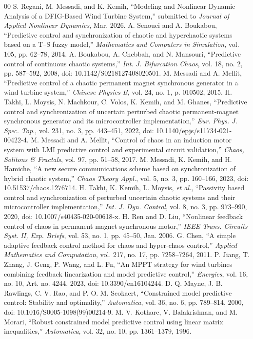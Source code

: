 \documentclass[conference]{IEEEtran}
\begin{document}
\begin{thebibliography}{00}
 S. Regani, M. Messadi, and K. Kemih, ``Modeling and Nonlinear Dynamic Analysis of a DFIG-Based Wind Turbine System,'' submitted to \textit{Journal of Applied Nonlinear Dynamics}, Mar. 2026.
 A. Senouci and A. Boukabou, ``Predictive control and synchronization of chaotic and hyperchaotic systems based on a T--S fuzzy model,'' \textit{Mathematics and Computers in Simulation}, vol. 105, pp. 62--78, 2014.
 A. Boukabou, A. Chebbah, and N. Mansouri, ``Predictive control of continuous chaotic systems,'' \textit{Int. J. Bifurcation Chaos}, vol. 18, no. 2, pp. 587--592, 2008, doi: 10.1142/S0218127408020501.
 M. Messadi and A. Mellit, ``Predictive control of a chaotic permanent magnet synchronous generator in a wind turbine system,'' \textit{Chinese Physics B}, vol. 24, no. 1, p. 010502, 2015.
 H. Takhi, L. Moysis, N. Machkour, C. Volos, K. Kemih, and M. Ghanes, ``Predictive control and synchronization of uncertain perturbed chaotic permanent-magnet synchronous generator and its microcontroller implementation,'' \textit{Eur. Phys. J. Spec. Top.}, vol. 231, no. 3, pp. 443--451, 2022, doi: 10.1140/epjs/s11734-021-00422-4.
 M. Messadi and A. Mellit, ``Control of chaos in an induction motor system with LMI predictive control and experimental circuit validation,'' \textit{Chaos, Solitons \& Fractals}, vol. 97, pp. 51--58, 2017.
 M. Messadi, K. Kemih, and H. Hamiche, ``A new secure communications scheme based on synchronization of hybrid chaotic system,'' \textit{Chaos Theory Appl.}, vol. 5, no. 3, pp. 160--166, 2023, doi: 10.51537/chaos.1276714.
 H. Takhi, K. Kemih, L. Moysis, \textit{et al.}, ``Passivity based control and synchronization of perturbed uncertain chaotic systems and their microcontroller implementation,'' \textit{Int. J. Dyn. Control}, vol. 8, no. 3, pp. 973--990, 2020, doi: 10.1007/s40435-020-00618-x.
 H. Ren and D. Liu, ``Nonlinear feedback control of chaos in permanent magnet synchronous motor,'' \textit{IEEE Trans. Circuits Syst. II, Exp. Briefs}, vol. 53, no. 1, pp. 45--50, Jan. 2006.
 G. Chen, ``A simple adaptive feedback control method for chaos and hyper-chaos control,'' \textit{Applied Mathematics and Computation}, vol. 217, no. 17, pp. 7258--7264, 2011.
 P. Jiang, T. Zhang, J. Geng, P. Wang, and L. Fu, ``An MPPT strategy for wind turbines combining feedback linearization and model predictive control,'' \textit{Energies}, vol. 16, no. 10, Art. no. 4244, 2023, doi: 10.3390/en16104244.
 D. Q. Mayne, J. B. Rawlings, C. V. Rao, and P. O. M. Scokaert, ``Constrained model predictive control: Stability and optimality,'' \textit{Automatica}, vol. 36, no. 6, pp. 789--814, 2000, doi: 10.1016/S0005-1098(99)00214-9.
 M. V. Kothare, V. Balakrishnan, and M. Morari, ``Robust constrained model predictive control using linear matrix inequalities,'' \textit{Automatica}, vol. 32, no. 10, pp. 1361--1379, 1996.
\end{thebibliography}
\end{document}
